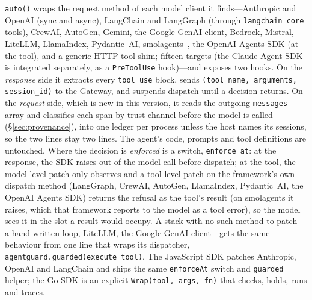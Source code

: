 \documentclass[sigconf,nonacm]{acmart}
\begin{document}
\noindent \texttt{auto()} wraps the request method of each model client
it finds---Anthropic and OpenAI (sync and async), LangChain and LangGraph
(through \texttt{langchain\_core} tools), CrewAI, AutoGen, Gemini, the
Google GenAI client, Bedrock, Mistral, LiteLLM, LlamaIndex, Pydantic~AI,
smolagents~\cite{smolagents2024}, the OpenAI Agents SDK (at the tool), and a
generic HTTP-tool shim; fifteen targets (the Claude Agent SDK is integrated
separately, as a \texttt{PreToolUse} hook)---and
exposes two hooks. On the \emph{response}
side it extracts every \texttt{tool\_use} block, sends
\texttt{(tool\_name, arguments, session\_id)} to the Gateway, and
suspends dispatch until a decision returns. On the \emph{request} side,
which is new in this version, it reads the outgoing \texttt{messages}
array and classifies each span by trust channel before the model is
called (\S\ref{sec:provenance}), into one ledger per process unless the
host names its sessions, so the two lines stay two lines. The agent's code, prompts and tool
definitions are untouched. Where the decision is \emph{enforced} is a
switch, \texttt{enforce\_at}: at the response, the SDK raises out of the
model call before dispatch; at the tool, the model-level patch only
observes and a tool-level patch on the framework's own dispatch method
(LangGraph, CrewAI, AutoGen, LlamaIndex, Pydantic~AI, the
OpenAI Agents SDK) returns the refusal as the tool's result (on smolagents
it raises, which that framework reports to the model as a tool error), so the model
sees it in the slot a result would occupy. A stack with no such method
to patch---a hand-written loop, LiteLLM, the Google GenAI client---gets
the same behaviour from one line that wraps its dispatcher,
\texttt{agentguard.guarded(execute\_tool)}. The JavaScript SDK patches
Anthropic, OpenAI and LangChain and ships the same \texttt{enforceAt}
switch and \texttt{guarded} helper; the Go SDK is an explicit
\texttt{Wrap(tool, args, fn)} that checks, holds, runs and traces.
\end{document}
